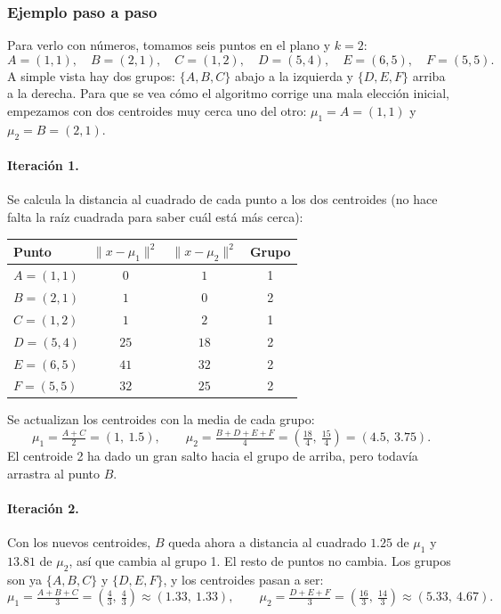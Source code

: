 \documentclass[11pt,a4paper]{article}
\begin{document}
\subsubsection*{Ejemplo paso a paso}

Para verlo con números, tomamos seis puntos en el plano y $k=2$:
\[
A=(1,1),\quad B=(2,1),\quad C=(1,2),\quad D=(5,4),\quad E=(6,5),\quad F=(5,5).
\]
A simple vista hay dos grupos: $\{A,B,C\}$ abajo a la izquierda y $\{D,E,F\}$ arriba a la derecha. Para que se vea cómo el algoritmo corrige una mala elección inicial, empezamos con dos centroides muy cerca uno del otro: $\mu_1 = A = (1,1)$ y $\mu_2 = B = (2,1)$.

\paragraph{Iteración 1.} Se calcula la distancia al cuadrado de cada punto a los dos centroides (no hace falta la raíz cuadrada para saber cuál está más cerca):

\begin{center}
\begin{tabular}{@{}lccc@{}}
\toprule
\textbf{Punto} & $\lVert x - \mu_1 \rVert^2$ & $\lVert x - \mu_2 \rVert^2$ & \textbf{Grupo} \\
\midrule
$A=(1,1)$ & $0$  & $1$  & 1 \\
$B=(2,1)$ & $1$  & $0$  & 2 \\
$C=(1,2)$ & $1$  & $2$  & 1 \\
$D=(5,4)$ & $25$ & $18$ & 2 \\
$E=(6,5)$ & $41$ & $32$ & 2 \\
$F=(5,5)$ & $32$ & $25$ & 2 \\
\bottomrule
\end{tabular}
\end{center}

Se actualizan los centroides con la media de cada grupo:
\[
\mu_1 = \tfrac{A+C}{2} = (1,\ 1.5), \qquad
\mu_2 = \tfrac{B+D+E+F}{4} = \left(\tfrac{18}{4},\ \tfrac{15}{4}\right) = (4.5,\ 3.75).
\]
El centroide 2 ha dado un gran salto hacia el grupo de arriba, pero todavía arrastra al punto $B$.

\paragraph{Iteración 2.} Con los nuevos centroides, $B$ queda ahora a distancia al cuadrado $1.25$ de $\mu_1$ y $13.81$ de $\mu_2$, así que cambia al grupo 1. El resto de puntos no cambia. Los grupos son ya $\{A,B,C\}$ y $\{D,E,F\}$, y los centroides pasan a ser:
\[
\mu_1 = \tfrac{A+B+C}{3} = \left(\tfrac{4}{3},\ \tfrac{4}{3}\right) \approx (1.33,\ 1.33), \qquad
\mu_2 = \tfrac{D+E+F}{3} = \left(\tfrac{16}{3},\ \tfrac{14}{3}\right) \approx (5.33,\ 4.67).
\]
\end{document}
